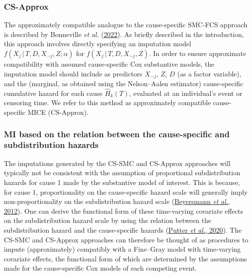 \documentclass[
  letterpaper,
  DIV=11,
  numbers=noendperiod]{scrreprt}
\newcommand{\given}{\,|\,}
\begin{document}
\hypertarget{sec-cs-approx}{%
\subsubsection{CS-Approx}\label{sec-cs-approx}}

The approximately compatible analogue to the cause-specific SMC-FCS
approach is described by Bonneville \emph{et al.}
(\protect\hyperlink{ref-bonnevilleMultipleImputationCausespecific2022}{2022}).
As briefly described in the introduction, this approach involves
directly specifying an imputation model
\(f(X_j \given T, D, X_{-j}, Z;\alpha)\) for
\(f(X_j \given T, D, X_{-j}, Z)\). In order to ensure approximate
compatibility with assumed cause-specific Cox substantive models, the
imputation model should include as predictors \(X_{-j}\), \(Z\), \(D\)
(as a factor variable), and the (marginal, as obtained using the
Nelson--Aalen estimator) cause-specific cumulative hazard for each cause
\(\hat{H}_k(T)\), evaluated at an individual's event or censoring time.
We refer to this method as approximately compatible cause-specific MICE
(CS-Approx).

\hypertarget{mi-based-on-the-relation-between-the-cause-specific-and-subdistribution-hazards}{%
\subsubsection{MI based on the relation between the cause-specific and
subdistribution
hazards}\label{mi-based-on-the-relation-between-the-cause-specific-and-subdistribution-hazards}}

The imputations generated by the CS-SMC and CS-Approx approaches will
typically not be consistent with the assumption of proportional
subdistribution hazards for cause 1 made by the substantive model of
interest. This is because, for cause 1, proportionality on the
cause-specific hazard scale will generally imply non-proportionality on
the subdistribution hazard scale
(\protect\hyperlink{ref-beyersmannCompetingRisksMultistate2012}{Beyersmann
\emph{et al.}, 2012}). One can derive the functional form of these
time-varying covariate effects on the subdistribution hazard scale by
using the relation between the subdistribution hazard and the
cause-specific hazards
(\protect\hyperlink{ref-putterRelationCausespecificHazard2020}{Putter
\emph{et al.}, 2020}). The CS-SMC and CS-Approx approaches can therefore
be thought of as procedures to impute (approximately) compatibly with a
Fine--Gray model with time-varying covariate effects, the functional
form of which are determined by the assumptions made for the
cause-specific Cox models of each competing event.
\end{document}

